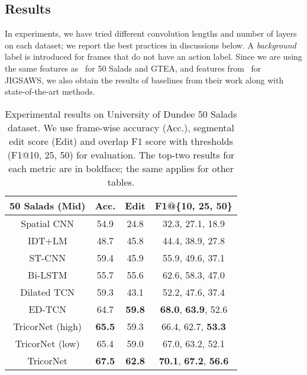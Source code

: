 \documentclass{article}
\begin{document}
\subsection{Results}

In experiments, we have tried different convolution lengths and number of layers on each dataset; we report the best practices in discussions below. A \textit{background} label is introduced for frames that do not have an action label. Since we are using the same features as~\cite{LeFlViCVPR2017} for 50 Salads and GTEA, and features from~\cite{tcnw} for JIGSAWS, we also obtain the results of baselines from their work along with state-of-the-art methods. 

\begin{table}
	\centering
	\caption{Experimental results on University of Dundee 50 Salads dataset. We use frame-wise accuracy (Acc.), segmental edit score (Edit) and overlap F1 score with thresholds (F1@10, 25, 50) for evaluation. The top-two results for each metric are in boldface; the same applies for other tables.}
	\label{salads}
	\begin{tabular}{|c|c|c|c|}
		\hline
		\textbf{50 Salads (Mid)} & \textbf{Acc.} & \textbf{Edit} & \textbf{F1@\{10, 25, 50\}} \\ \hline
		Spatial CNN \cite{scnn}              & 54.9              & 24.8                & 32.3, 27.1, 18.9                \\
		IDT+LM   \cite{richard}                & 48.7              & 45.8                & 44.4, 38.9, 27.8                \\
		ST-CNN   \cite{scnn}                & 59.4              & 45.9                & 55.9, 49.6, 37.1                \\
		Bi-LSTM                  & 55.7              & 55.6                & 62.6, 58.3, 47.0                \\
		Dilated TCN    \cite{LeFlViCVPR2017}          & 59.3              & 43.1                & 52.2, 47.6, 37.4                \\
		ED-TCN       \cite{LeFlViCVPR2017}            & 64.7             & \textbf{59.8}                & \textbf{68.0}, \textbf{63.9}, 52.6                \\ \hline
		TricorNet (high)                     & \textbf{65.5}     & 59.3       & 66.4, 62.7, \textbf{53.3}       \\
		TricorNet (low)                     & 65.4     & 59.0      & 67.0, 63.2, 52.1      \\
		TricorNet                     & \textbf{67.5}     & \textbf{62.8}       & \textbf{70.1}, \textbf{67.2}, \textbf{56.6}       \\ \hline
	\end{tabular}
\end{table}
\end{document}
